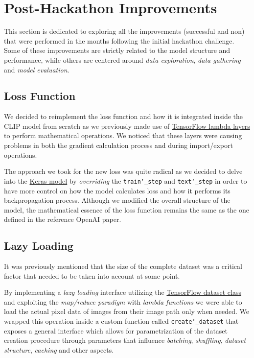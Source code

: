 \documentclass[12pt, a4paper]{article}
\begin{document}
\section{Post-Hackathon Improvements}
This section is dedicated to exploring all the improvements (successful and non) that were performed in the months following the initial hackathon challenge.
Some of these improvements are strictly related to the model structure and performance, while others are centered around \textit{data exploration}, \textit{data gathering} and \textit{model evaluation}.

\subsection{Loss Function}
We decided to reimplement the loss function and how it is integrated inside the CLIP model from scratch as we previously made use of \href{https://www.tensorflow.org/api_docs/python/tf/keras/layers/Lambda}{TensorFlow lambda layers} to perform mathematical operations.
We noticed that these layers were causing problems in both the gradient calculation process and during import/export operations.

The approach we took for the new loss was quite radical as we decided to delve into the \href{https://www.tensorflow.org/api_docs/python/tf/keras/Model}{Keras model} by \textit{overriding} the \texttt{train\char`_step} and \texttt{text\char`_step} in order to have more control on how the model calculates loss and how it performs its backpropagation process.
Although we modified the overall structure of the model, the mathematical essence of the loss function remains the same as the one defined in the reference OpenAI paper.

\subsection{Lazy Loading}
It was previously mentioned that the size of the complete dataset was a critical factor that needed to be taken into account at some point.

By implementing a \textit{lazy loading} interface utilizing the \href{https://www.tensorflow.org/api_docs/python/tf/data/Dataset}{TensorFlow dataset class} and exploiting the \textit{map/reduce paradigm} with \textit{lambda functions} we were able to load the actual pixel data of images from their image path only when needed.
We wrapped this operation inside a custom function called \texttt{create\char`_dataset} that exposes a general interface which allows for parametrization of the dataset creation procedure through parameters that influence \textit{batching}, \textit{shuffling}, \textit{dataset structure}, \textit{caching} and other aspects.
\end{document}
